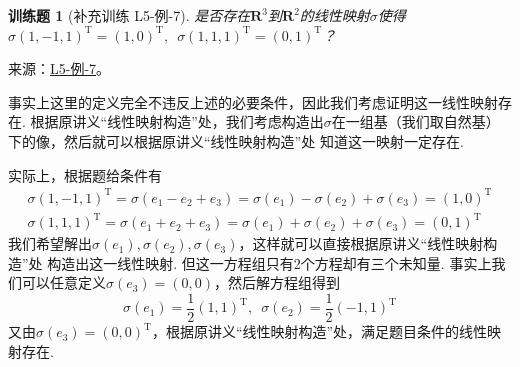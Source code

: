 \documentclass[UTF8,12pt,a4paper,fontset=fandol]{ctexart}
\newtheorem{exercise}{训练题}[section]
\begin{document}
\begin{exercise}[补充训练 L5-例-7]\label{prob:L5-例-7}
是否存在$\mathbf{R}^3$到$\mathbf{R}^2$的线性映射$\sigma$使得$\sigma(1,-1,1)^{\mathrm{T}}=(1,0)^{\mathrm{T}},\enspace\sigma(1,1,1)^{\mathrm{T}}=(0,1)^{\mathrm{T}}$？
\end{exercise}
\noindent 来源：\href{https://github.com/yhwu-is/Linear-Algebra-Left-Undone/blob/new/%E8%AE%B2%E4%B9%89/%E4%B8%93%E9%A2%98/5%20%E7%BA%BF%E6%80%A7%E6%98%A0%E5%B0%84.tex}{L5-例-7}。
\begin{solve}
事实上这里的定义完全不违反上述的必要条件，因此我们考虑证明这一线性映射存在. 根据原讲义“线性映射构造”处，我们考虑构造出$\sigma$在一组基（我们取自然基）下的像，然后就可以根据原讲义“线性映射构造”处 知道这一映射一定存在.

    实际上，根据题给条件有
    \begin{gather*}
        \sigma(1,-1,1)^{\mathrm{T}}
        =\sigma(e_1-e_2+e_3)
        =\sigma(e_1)-\sigma(e_2)+\sigma(e_3)
        =(1,0)^{\mathrm{T}} \\
        \sigma(1,1,1)^{\mathrm{T}}
        =\sigma(e_1+e_2+e_3)
        =\sigma(e_1)+\sigma(e_2)+\sigma(e_3)
        =(0,1)^{\mathrm{T}}
    \end{gather*}
    我们希望解出$\sigma(e_1),\sigma(e_2),\sigma(e_3)$，这样就可以直接根据原讲义“线性映射构造”处 构造出这一线性映射. 但这一方程组只有2个方程却有三个未知量. 事实上我们可以任意定义$\sigma(e_3)=(0,0)$，然后解方程组得到
    \[\sigma(e_1)=\dfrac{1}{2} (1,1)^{\mathrm{T}},\enspace \sigma(e_2)=\dfrac{1}{2} (-1,1)^{\mathrm{T}}\]
    又由$\sigma(e_3)=(0,0)^{\mathrm{T}}$，根据原讲义“线性映射构造”处，满足题目条件的线性映射存在.
\end{solve}
\end{document}
